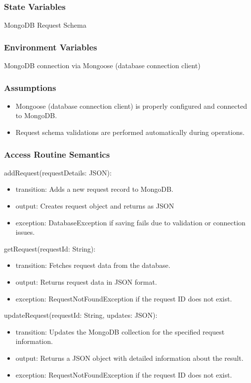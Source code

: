 \documentclass[12pt, titlepage]{article}
\begin{document}
\subsubsection{State Variables}
MongoDB Request Schema

\subsubsection{Environment Variables}
MongoDB connection via Mongoose (database connection client)

\subsubsection{Assumptions}
\begin{itemize}
  \item Mongoose (database connection client) is properly configured and connected to MongoDB.
  \item Request schema validations are performed automatically during operations.
\end{itemize}

\subsubsection{Access Routine Semantics}

\noindent addRequest(requestDetails: JSON):
\begin{itemize}
  \item transition: Adds a new request record to MongoDB.
  \item output: Creates request object and returns as JSON
  \item exception: DatabaseException if saving fails due to validation or connection issues.
\end{itemize}

\noindent getRequest(requestId: String):
\begin{itemize}
  \item transition: Fetches request data from the database.
  \item output: Returns request data in JSON format.
  \item exception: RequestNotFoundException if the request ID does not exist.
\end{itemize}

\noindent updateRequest(requestId: String, updates: JSON):
\begin{itemize}
  \item transition: Updates the MongoDB collection for the specified request information.
  \item output: Returns a JSON object with detailed information about the result.
  \item exception: RequestNotFoundException if the request ID does not exist.
\end{itemize}
\end{document}

